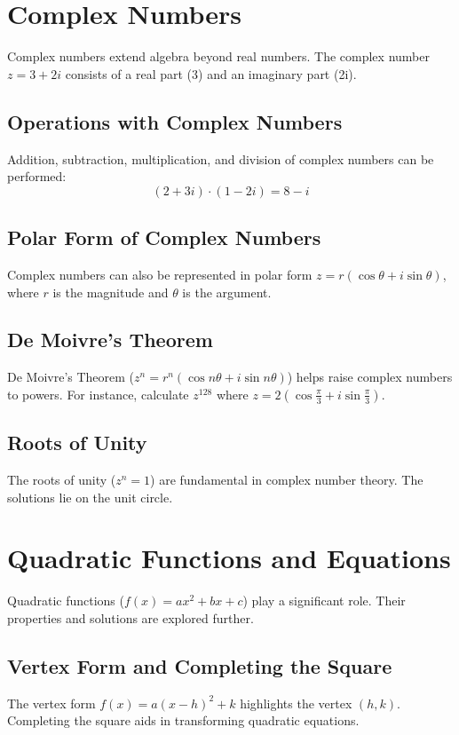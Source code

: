 \documentclass{article}
\begin{document}
\section{Complex Numbers}
Complex numbers extend algebra beyond real numbers. The complex number \(z = 3 + 2i\) consists of a real part (3) and an imaginary part (2i).

\subsection{Operations with Complex Numbers}
Addition, subtraction, multiplication, and division of complex numbers can be performed:
\[ (2 + 3i) \cdot (1 - 2i) = 8 - i \]

\subsection{Polar Form of Complex Numbers}
Complex numbers can also be represented in polar form \(z = r(\cos \theta + i \sin \theta)\), where \(r\) is the magnitude and \(\theta\) is the argument.

\subsection{De Moivre's Theorem}
De Moivre's Theorem (\(z^n = r^n(\cos n\theta + i \sin n\theta)\)) helps raise complex numbers to powers. For instance, calculate \(z^{128}\) where \(z = 2(\cos \frac{\pi}{3} + i \sin \frac{\pi}{3})\).

\subsection{Roots of Unity}
The roots of unity (\(z^n = 1\)) are fundamental in complex number theory. The solutions lie on the unit circle.

\section{Quadratic Functions and Equations}
Quadratic functions (\(f(x) = ax^2 + bx + c\)) play a significant role. Their properties and solutions are explored further.

\subsection{Vertex Form and Completing the Square}
The vertex form \(f(x) = a(x - h)^2 + k\) highlights the vertex \((h, k)\). Completing the square aids in transforming quadratic equations.
\end{document}
